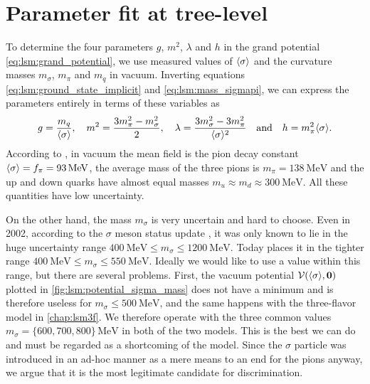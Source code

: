 \section{Parameter fit at tree-level}
\label{sec:lsm:parameter_fit}

To determine the four parameters $g$, $m^2$, $\lambda$ and $h$ in the grand potential \eqref{eq:lsm:grand_potential},
we use measured values of $\langle \sigma \rangle$ and the curvature masses $ m_\sigma$, $m_\pi$ and $m_q$ in vacuum.
Inverting equations \eqref{eq:lsm:ground_state_implicit} and \eqref{eq:lsm:mass_sigmapi},
we can express the parameters entirely in terms of these variables as
\begin{equation}
	g       = \frac{m_q}{\avg{\sigma}}, \quad %
	m^2     = \frac{3m_\pi^2 - m_\sigma^2}{2}, \quad %
	\lambda = \frac{3 m_\sigma^2 - 3 m_\pi^2}{\avg{\sigma}^2} %
	\quad \text{and} \quad
	h       = m_\pi^2 \avg{\sigma}. %
\label{eq:lsm:parameters}
\end{equation}
According to \cite{ref:pdg_review_2021}, in vacuum the mean field is the pion decay constant $\langle \sigma \rangle = f_\pi = \SI{93}{\mega\electronvolt}$,
the average mass of the three pions is $m_\pi = \SI{138}{\mega\electronvolt}$
and the up and down quarks have almost equal masses $m_u \approx m_d \approx \SI{300}{\mega\electronvolt}$.
All these quantities have low uncertainty.


On the other hand, the mass $m_\sigma$ is very uncertain and hard to choose.
Even in 2002, according to the $\sigma$ meson status update \cite{ref:sigma_meson_status},
it was only known to lie in the huge uncertainty range $\SI{400}{\mega\electronvolt} \leq m_\sigma \leq \SI{1200}{\mega\electronvolt}$.
Today \cite{ref:pdg_review_2021} places it in the tighter range $\SI{400}{\mega\electronvolt} \leq m_\sigma \leq \SI{550}{\mega\electronvolt}$.
Ideally we would like to use a value within this range, but there are several problems.
First, the vacuum potential $\mathcal{V}(\langle \sigma \rangle,{\bm{0}})$ plotted in \cref{fig:lsm:potential_sigma_mass} does not have a minimum and is therefore useless for $m_\sigma \leq \SI{500}{\mega\electronvolt}$,
and the same happens with the three-flavor model in \cref{chap:lsm3f}.
We therefore operate with the three common values $m_\sigma = \{600,700,800\} \, \si{\mega\electronvolt}$ in both of the two models.
This is the best we can do and must be regarded as a shortcoming of the model.
Since the $\sigma$ particle was introduced in an ad-hoc manner
as a mere means to an end for the pions anyway,
we argue that it is the most legitimate candidate for discrimination.

